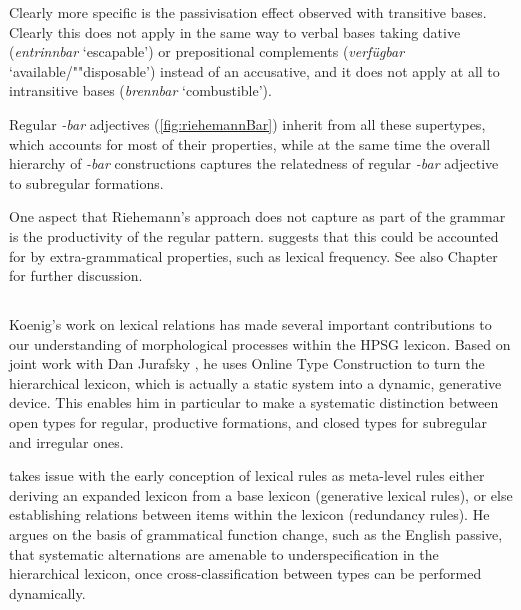 \documentclass[output=paper
	        ,collection
	        ,collectionchapter
 	        ,biblatex
                ,babelshorthands
                ,newtxmath
                ,draftmode
                ,colorlinks, citecolor=brown
]{langscibook}
\begin{document}
Clearly more specific is the passivisation effect observed with
transitive bases. Clearly this does not apply in the same way to
verbal bases taking dative (\textit{entrinnbar} `escapable') or
prepositional complements (\textit{verfügbar} `available/""disposable')
instead of an accusative, and it does not apply at all to intransitive
bases (\textit{brennbar} `combustible').  

\begin{exe}
  \ex
\end{exe}

Regular \textit{-bar} adjectives (\ref{fig:riehemannBar}) inherit from all these supertypes, which
accounts for most of their properties, while at the same time the overall hierarchy of \textit{-bar} constructions
captures the relatedness of regular \textit{-bar} adjective to subregular formations. 


One aspect that Riehemann's approach does not capture as part of the
grammar is the productivity of the regular
pattern. \citet{Riehemann98} suggests that this could be accounted for
by extra-grammatical properties, such as lexical frequency. See also
Chapter~ for further discussion.

\subsection{\citet{Koenig99}}

Koenig's work on lexical relations has made several important
contributions to our understanding of morphological processes within
the HPSG lexicon. Based on joint work with Dan Jurafsky
\citep{Koenig94}, he uses Online Type Construction to turn the
hierarchical lexicon, which is actually a static system into a
dynamic, generative device. This enables him in particular to make a
systematic distinction between open types for regular, productive
formations, and closed types for subregular and irregular ones.

\citet{Koenig99} takes issue with the early conception of lexical
rules as meta-level rules either deriving an expanded lexicon from a
base lexicon (generative lexical rules), or else establishing
relations between items within the lexicon (redundancy rules). He
argues on the basis of grammatical function change, such as the
English passive, that systematic alternations are amenable to
underspecification in the hierarchical lexicon,  once
cross-classification between types can be performed dynamically.
\end{document}
